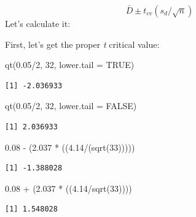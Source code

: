 \documentclass[
  11pt,
]{book}
\newenvironment{Shaded}{\begin{snugshade}}{\end{snugshade}}
\newcommand{\AttributeTok}[1]{\textcolor[rgb]{0.77,0.63,0.00}{#1}}
\newcommand{\ConstantTok}[1]{\textcolor[rgb]{0.00,0.00,0.00}{#1}}
\newcommand{\DecValTok}[1]{\textcolor[rgb]{0.00,0.00,0.81}{#1}}
\newcommand{\FloatTok}[1]{\textcolor[rgb]{0.00,0.00,0.81}{#1}}
\newcommand{\FunctionTok}[1]{\textcolor[rgb]{0.00,0.00,0.00}{#1}}
\newcommand{\NormalTok}[1]{#1}
\newcommand{\SpecialCharTok}[1]{\textcolor[rgb]{0.00,0.00,0.00}{#1}}
\begin{document}
\[\bar{D}\pm t_{cv}(s_{d}/\sqrt{n})\]
Let's calculate it:

First, let's get the proper \emph{t} critical value:

\begin{Shaded}
\begin{Highlighting}[]
\FunctionTok{qt}\NormalTok{(}\FloatTok{0.05}\SpecialCharTok{/}\DecValTok{2}\NormalTok{, }\DecValTok{32}\NormalTok{, }\AttributeTok{lower.tail =} \ConstantTok{TRUE}\NormalTok{)}
\end{Highlighting}
\end{Shaded}

\begin{verbatim}
[1] -2.036933
\end{verbatim}

\begin{Shaded}
\begin{Highlighting}[]
\FunctionTok{qt}\NormalTok{(}\FloatTok{0.05}\SpecialCharTok{/}\DecValTok{2}\NormalTok{, }\DecValTok{32}\NormalTok{, }\AttributeTok{lower.tail =} \ConstantTok{FALSE}\NormalTok{)}
\end{Highlighting}
\end{Shaded}

\begin{verbatim}
[1] 2.036933
\end{verbatim}

\begin{Shaded}
\begin{Highlighting}[]
\FloatTok{0.08} \SpecialCharTok{{-}}\NormalTok{ (}\FloatTok{2.037} \SpecialCharTok{*}\NormalTok{ ((}\FloatTok{4.14}\SpecialCharTok{/}\NormalTok{(}\FunctionTok{sqrt}\NormalTok{(}\DecValTok{33}\NormalTok{)))))}
\end{Highlighting}
\end{Shaded}

\begin{verbatim}
[1] -1.388028
\end{verbatim}

\begin{Shaded}
\begin{Highlighting}[]
\FloatTok{0.08} \SpecialCharTok{+}\NormalTok{ (}\FloatTok{2.037} \SpecialCharTok{*}\NormalTok{ ((}\FloatTok{4.14}\SpecialCharTok{/}\FunctionTok{sqrt}\NormalTok{(}\DecValTok{33}\NormalTok{))))}
\end{Highlighting}
\end{Shaded}

\begin{verbatim}
[1] 1.548028
\end{verbatim}
\end{document}
